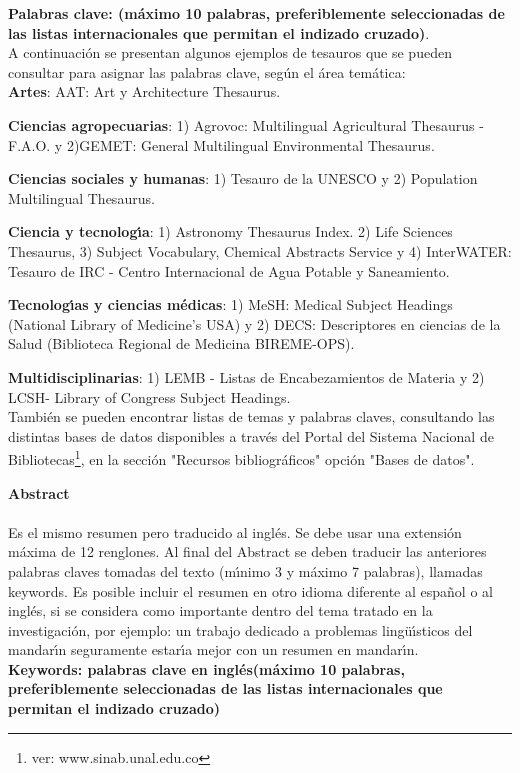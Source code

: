 \textbf{\small Palabras clave: (m\'{a}ximo 10 palabras, preferiblemente seleccionadas de las listas internacionales que permitan el indizado cruzado)}.\\

A continuaci\'{o}n se presentan algunos ejemplos de tesauros que se pueden consultar para asignar las palabras clave, seg\'{u}n el \'{a}rea tem\'{a}tica:\\

\textbf{Artes}: AAT: Art y Architecture Thesaurus.

\textbf{Ciencias agropecuarias}: 1) Agrovoc: Multilingual Agricultural Thesaurus - F.A.O. y 2)GEMET: General Multilingual Environmental Thesaurus.

\textbf{Ciencias sociales y humanas}: 1) Tesauro de la UNESCO y 2) Population Multilingual Thesaurus.

\textbf{Ciencia y tecnolog\'{\i}a}: 1) Astronomy Thesaurus Index. 2) Life Sciences Thesaurus, 3) Subject Vocabulary, Chemical Abstracts Service y 4) InterWATER: Tesauro de IRC - Centro Internacional de Agua Potable y Saneamiento.

\textbf{Tecnolog\'{\i}as y ciencias m\'{e}dicas}: 1) MeSH: Medical Subject Headings (National Library of Medicine's USA) y 2) DECS: Descriptores en ciencias de la Salud (Biblioteca Regional de Medicina BIREME-OPS).

\textbf{Multidisciplinarias}: 1) LEMB - Listas de Encabezamientos de Materia y 2) LCSH- Library of Congress Subject Headings.\\

Tambi\'{e}n se pueden encontrar listas de temas y palabras claves, consultando las distintas bases de datos disponibles a trav\'{e}s del Portal del Sistema Nacional de Bibliotecas\footnote{ver: www.sinab.unal.edu.co}, en la secci\'{o}n "Recursos bibliogr\'{a}ficos" opci\'{o}n "Bases de datos".\\

\newpage

\textbf{\LARGE Abstract}\\\\
Es el mismo resumen pero traducido al ingl\'{e}s. Se debe usar una extensi\'{o}n m\'{a}xima de 12 renglones. Al final del Abstract se deben traducir las anteriores palabras claves tomadas del texto (m\'{\i}nimo 3 y m\'{a}ximo 7 palabras), llamadas keywords. Es posible incluir el resumen en otro idioma diferente al espa\~{n}ol o al ingl\'{e}s, si se considera como importante dentro del tema tratado en la investigaci\'{o}n, por ejemplo: un trabajo dedicado a problemas ling\"{u}\'{\i}sticos del mandar\'{\i}n seguramente estar\'{\i}a mejor con un resumen en mandar\'{\i}n.\\[2.0cm]
\textbf{\small Keywords: palabras clave en ingl\'{e}s(m\'{a}ximo 10 palabras, preferiblemente seleccionadas de las listas internacionales que permitan el indizado cruzado)}\\